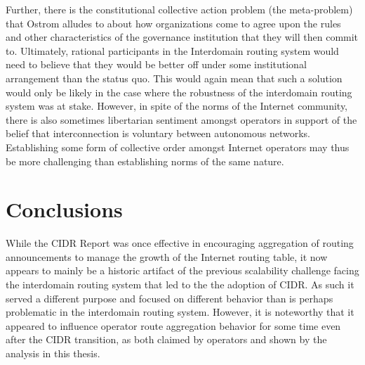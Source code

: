 Further, there is the constitutional collective action problem (the
meta-problem) that Ostrom alludes to about how organizations come to agree upon
the rules and other characteristics of the governance institution that they
will then commit to. Ultimately, rational participants in the Interdomain
routing system would need to believe that they would be better off under some
institutional arrangement than the status quo. This would again mean that such
a solution would only be likely in the case where the robustness of the
interdomain routing system was at stake. However, in spite of the norms of the
Internet community, there is also sometimes libertarian sentiment amongst
operators in support of the belief that interconnection is voluntary between
autonomous networks. Establishing some form of collective order amongst
Internet operators may thus be more challenging than establishing norms of the
same nature.




%
%

\section{Conclusions}
While the CIDR Report was once effective in encouraging aggregation of routing
announcements to manage the growth of the Internet routing table, it now
appears to mainly be a historic artifact of the previous scalability challenge
facing the interdomain routing system that led to the the adoption of CIDR. As
such it served a different purpose and focused on different behavior than is
perhaps problematic in the interdomain routing system. However, it is
noteworthy that it appeared to influence operator route aggregation behavior
for some time even after the CIDR transition, as both claimed by operators and
shown by the analysis in this thesis.

